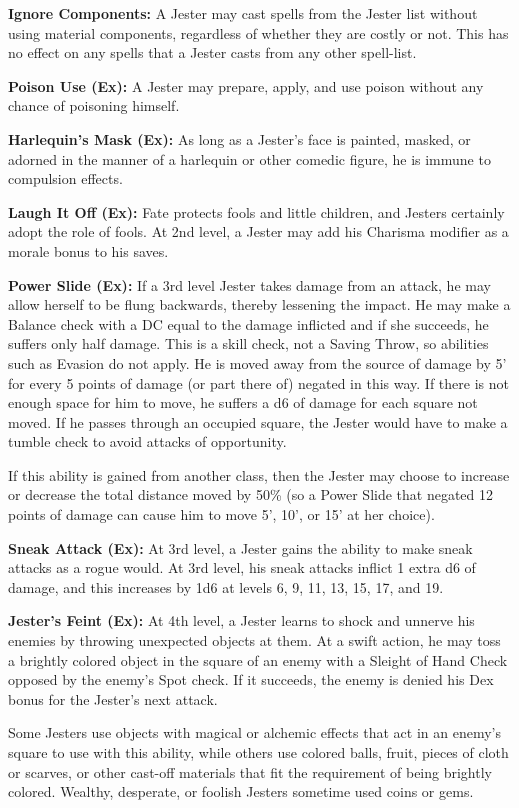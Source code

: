 \textbf{Ignore Components:} A Jester may cast spells from the Jester list without using material components, regardless of whether they are costly or not. This has no effect on any spells that a Jester casts from any other spell-list.

\textbf{Poison Use (Ex):} A Jester may prepare, apply, and use poison without any chance of poisoning himself.

\textbf{Harlequin's Mask (Ex):} As long as a Jester's face is painted, masked, or adorned in the manner of a harlequin or other comedic figure, he is immune to compulsion effects.

\textbf{Laugh It Off (Ex):} Fate protects fools and little children, and Jesters certainly adopt the role of fools. At 2nd level, a Jester may add his Charisma modifier as a morale bonus to his saves.

\textbf{Power Slide (Ex):} If a 3rd level Jester takes damage from an attack, he may allow herself to be flung backwards, thereby lessening the impact. He may make a Balance check with a DC equal to the damage inflicted and if she succeeds, he suffers only half damage. This is a skill check, not a Saving Throw, so abilities such as Evasion do not apply. He is moved away from the source of damage by 5' for every 5 points of damage (or part there of) negated in this way. If there is not enough space for him to move, he suffers a d6 of damage for each square not moved. If he passes through an occupied square, the Jester would have to make a tumble check to avoid attacks of opportunity.

If this ability is gained from another class, then the Jester may choose to increase or decrease the total distance moved by 50\% (so a Power Slide that negated 12 points of damage can cause him to move 5', 10', or 15' at her choice).

\textbf{Sneak Attack (Ex):} At 3rd level, a Jester gains the ability to make sneak attacks as a rogue would. At 3rd level, his sneak attacks inflict 1 extra d6 of damage, and this increases by 1d6 at levels 6, 9, 11, 13, 15, 17, and 19.

\textbf{Jester's Feint (Ex):} At 4th level, a Jester learns to shock and unnerve his enemies by throwing unexpected objects at them. At a swift action, he may toss a brightly colored object in the square of an enemy with a Sleight of Hand Check opposed by the enemy's Spot check. If it succeeds, the enemy is denied his Dex bonus for the Jester's next attack.

Some Jesters use objects with magical or alchemic effects that act in an enemy's square to use with this ability, while others use colored balls, fruit, pieces of cloth or scarves, or other cast-off materials that fit the requirement of being brightly colored. Wealthy, desperate, or foolish Jesters sometime used coins or gems.

